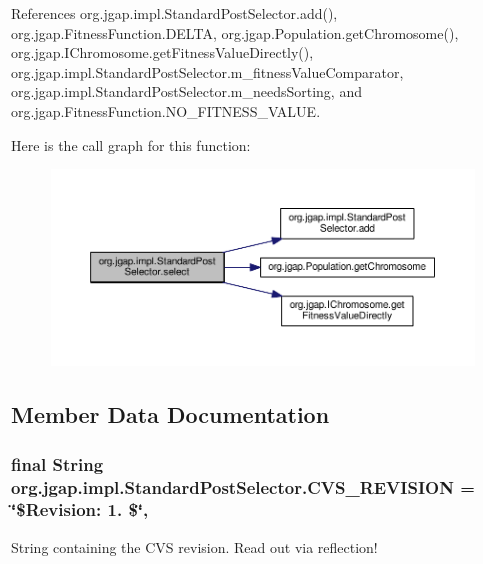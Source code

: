 References org.\-jgap.\-impl.\-Standard\-Post\-Selector.\-add(), org.\-jgap.\-Fitness\-Function.\-D\-E\-L\-T\-A, org.\-jgap.\-Population.\-get\-Chromosome(), org.\-jgap.\-I\-Chromosome.\-get\-Fitness\-Value\-Directly(), org.\-jgap.\-impl.\-Standard\-Post\-Selector.\-m\-\_\-fitness\-Value\-Comparator, org.\-jgap.\-impl.\-Standard\-Post\-Selector.\-m\-\_\-needs\-Sorting, and org.\-jgap.\-Fitness\-Function.\-N\-O\-\_\-\-F\-I\-T\-N\-E\-S\-S\-\_\-\-V\-A\-L\-U\-E.



Here is the call graph for this function\-:
\nopagebreak
\begin{figure}[H]
\begin{center}
\leavevmode
\includegraphics[width=350pt]{classorg_1_1jgap_1_1impl_1_1_standard_post_selector_af9a6e0f7933eaaef905cece58c933a5d_cgraph}
\end{center}
\end{figure}




\subsection{Member Data Documentation}
\hypertarget{classorg_1_1jgap_1_1impl_1_1_standard_post_selector_a9fffa9608614f556a964a06de12d9641}{
\subsubsection[{C\-V\-S\-\_\-\-R\-E\-V\-I\-S\-I\-O\-N}]{\setlength{\rightskip}{0pt plus 5cm}final String org.\-jgap.\-impl.\-Standard\-Post\-Selector.\-C\-V\-S\-\_\-\-R\-E\-V\-I\-S\-I\-O\-N = \char`\"{}\$Revision\-: 1. \$\char`\"{}\hspace{0.3cm}{\ttfamily [static]}, {\ttfamily [private]}}}\label{classorg_1_1jgap_1_1impl_1_1_standard_post_selector_a9fffa9608614f556a964a06de12d9641}
String containing the C\-V\-S revision. Read out via reflection! 

